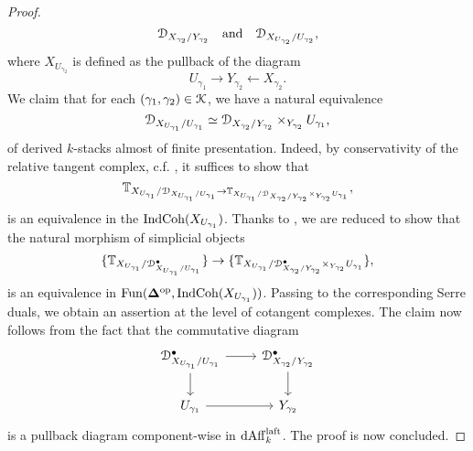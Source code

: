 \documentclass[10pt,a4paper,reqno]{amsart} %
\theoremstyle{plain}
\theoremstyle{definition}
\theoremstyle{remark}
\numberwithin{equation}{section}
\begin{document}
\begin{proof}
        \[
            \mathcal D_{X_{\gamma_2}/ Y_{\gamma_2}} \quad \mathrm{and} \quad \mathcal D_{X_{U_{\gamma_2}}/ U_{\gamma_2}},
        \]
    where $X_{U_{\gamma_2}}$ is defined as the pullback of the diagram
        \[
            U_{\gamma_1} \to Y_{\gamma_2} \leftarrow X_{\gamma_2}.  
        \]
    We claim that for each $(\gamma_1, \gamma_2) \in \mathcal K$, we have a natural equivalence
        \[
            \mathcal D_{X_{U_{\gamma_1}}/ U_{\gamma_1}} \simeq \mathcal D_{X_{\gamma_2}/ Y_{\gamma_2}} \times_{Y_{\gamma_2}} U_{\gamma_1},  
        \]
    of derived $k$-stacks almost of finite presentation. Indeed, by conservativity of the relative tangent complex, c.f. \cite[\S 5, Theorem 2.3.5]{Gaitsgory_Study_II}, it suffices to show that 
        \[
            \mathbb T_{X_{U_{\gamma_1}}/ \mathcal D_{X_{U_{\gamma_1}}/ U_{\gamma_1}} \to \mathbb T_{X_{U_{\gamma_1}}/ \mathcal D_{X_{\gamma_2}/ Y_{\gamma_2}} \times_{Y_{\gamma_2}} U_{\gamma_1}}},
        \]
    is an equivalence in the \infcat $\mathrm{Ind}\mathrm{Coh}(X_{U_{\gamma_1}})$. Thanks to \cite[\S 5, Corollary 2.3.6]{Gaitsgory_Study_II}, we are reduced to show that
    the natural morphism of simplicial objects
        \[
            \{ \mathbb T_{X_{U_{\gamma_1}}/ \mathcal D_{X_{U_{\gamma_1}}/ U_{\gamma_1}}^{\bullet}} \} \to \{ \mathbb T_{X_{U_{\gamma_1}}/ \mathcal D_{X_{\gamma_2}/ Y_{\gamma_2}}^{\bullet} \times_{Y_{\gamma_2}} U_{\gamma_1}} \},
        \]
    is an equivalence in $\operatorname{Fun}(\bm{\Delta}^\mathrm{op}, \mathrm{Ind}\mathrm{Coh}(X_{U_{\gamma_1}}))$. Passing to the corresponding Serre duals, we obtain an assertion at the level
    of cotangent complexes. The claim now follows from the fact that the commutative diagram
        \[
        \begin{tikzcd}
            \cD_{X_{U_{\gamma_1}}/ U_{\gamma_1}}^{ \bullet} \ar{r} \ar{d} & \cD_{X_{\gamma_2}/ Y_{\gamma_2}}^{\bullet} \ar{d} \\
            U_{\gamma_1} \ar{r} & Y_{\gamma_2} 
        \end{tikzcd}
        \]
    is a pullback diagram component-wise in $\mathrm{dAff}_k^{\mathrm{laft}}$. The proof is now concluded.
\end{proof}
\end{document}
